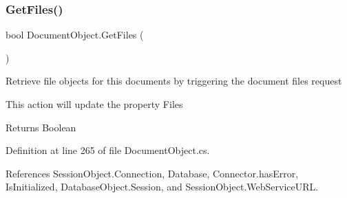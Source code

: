 \subsubsection{\texorpdfstring{Get\+Files()}{GetFiles()}}
{\footnotesize\ttfamily bool Document\+Object.\+Get\+Files (\begin{DoxyParamCaption}{ }\end{DoxyParamCaption})}



Retrieve file objects for this documents by triggering the document files request 

This action will update the property \textquotesingle{}Files\textquotesingle{}

\begin{DoxyReturn}{Returns}
Boolean
\end{DoxyReturn}


Definition at line 265 of file Document\+Object.\+cs.



References Session\+Object.\+Connection, Database, Connector.\+has\+Error, Is\+Initialized, Database\+Object.\+Session, and Session\+Object.\+Web\+Service\+U\+RL.


